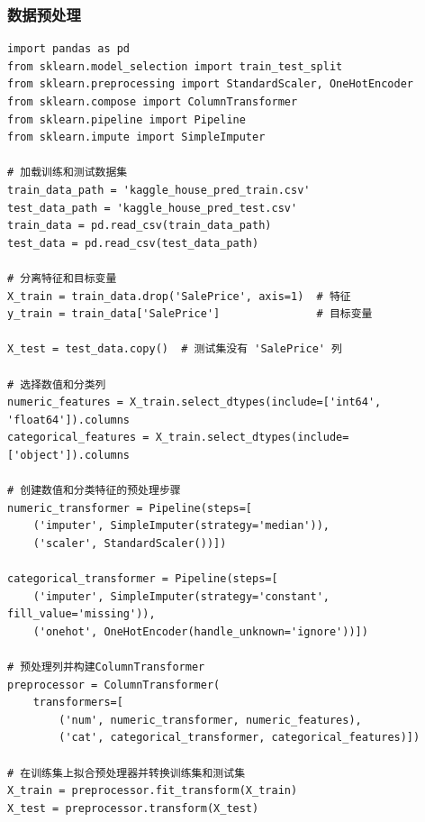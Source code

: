 \documentclass[a4paper,12pt]{article}
\begin{document}
\subsubsection{数据预处理}
\begin{lstlisting}
import pandas as pd
from sklearn.model_selection import train_test_split
from sklearn.preprocessing import StandardScaler, OneHotEncoder
from sklearn.compose import ColumnTransformer
from sklearn.pipeline import Pipeline
from sklearn.impute import SimpleImputer

# 加载训练和测试数据集
train_data_path = 'kaggle_house_pred_train.csv'
test_data_path = 'kaggle_house_pred_test.csv'
train_data = pd.read_csv(train_data_path)
test_data = pd.read_csv(test_data_path)

# 分离特征和目标变量
X_train = train_data.drop('SalePrice', axis=1)  # 特征
y_train = train_data['SalePrice']               # 目标变量

X_test = test_data.copy()  # 测试集没有 'SalePrice' 列

# 选择数值和分类列
numeric_features = X_train.select_dtypes(include=['int64', 'float64']).columns
categorical_features = X_train.select_dtypes(include=['object']).columns

# 创建数值和分类特征的预处理步骤
numeric_transformer = Pipeline(steps=[
    ('imputer', SimpleImputer(strategy='median')),
    ('scaler', StandardScaler())])

categorical_transformer = Pipeline(steps=[
    ('imputer', SimpleImputer(strategy='constant', fill_value='missing')),
    ('onehot', OneHotEncoder(handle_unknown='ignore'))])

# 预处理列并构建ColumnTransformer
preprocessor = ColumnTransformer(
    transformers=[
        ('num', numeric_transformer, numeric_features),
        ('cat', categorical_transformer, categorical_features)])

# 在训练集上拟合预处理器并转换训练集和测试集
X_train = preprocessor.fit_transform(X_train)
X_test = preprocessor.transform(X_test)
\end{lstlisting}
\end{document}
